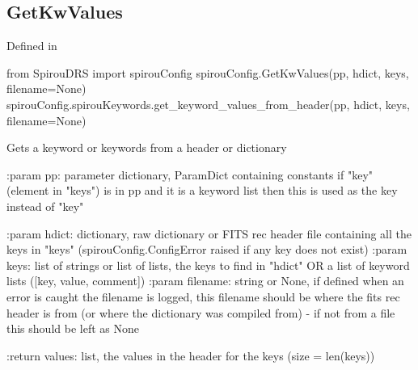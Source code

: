 \begin{minipage}{\textwidth}
\subsection{GetKwValues}

Defined in \spirouConfig{}

\begin{pythonbox}
from SpirouDRS import spirouConfig
spirouConfig.GetKwValues(pp, hdict, keys, filename=None)
spirouConfig.spirouKeywords.get_keyword_values_from_header(pp, hdict, keys, filename=None)
\end{pythonbox}

\begin{pythondocstring}
Gets a keyword or keywords from a header or dictionary

:param pp: parameter dictionary, ParamDict containing constants
            if "key" (element in "keys") is in pp and it is a
            keyword list then this is used as the key instead of "key"

:param hdict: dictionary, raw dictionary or FITS rec header file containing
              all the keys in "keys" (spirouConfig.ConfigError raised if
              any key does not exist)
:param keys: list of strings or list of lists, the keys to find in "hdict"
             OR a list of keyword lists ([key, value, comment])
:param filename: string or None, if defined when an error is caught the
                 filename is logged, this filename should be where the
                 fits rec header is from (or where the dictionary was
                 compiled from) - if not from a file this should be left
                 as None

:return values: list, the values in the header for the keys
                (size = len(keys))
\end{pythondocstring}
\end{minipage}

